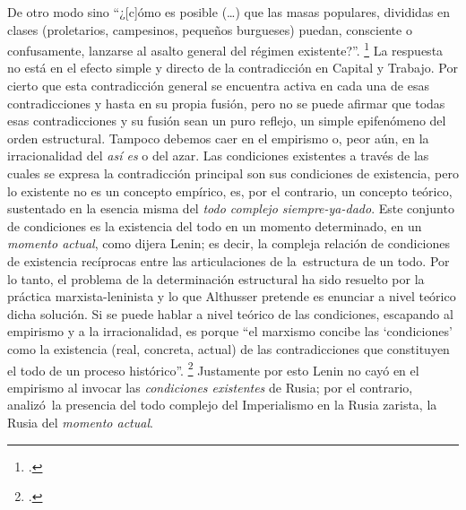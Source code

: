 De otro modo sino \enquote{¿{[}c{]}ómo es posible (\ldots) que las masas populares, divididas en clases (proletarios, campesinos, pequeños burgueses) puedan, consciente o confusamente, lanzarse al asalto general del régimen existente?}. \footcite[][80]{@7051-ALTHUSSER1965} La respuesta no está en el efecto simple y directo de la contradicción en Capital y Trabajo. Por cierto que esta contradicción general se encuentra activa en cada una de esas contradicciones y hasta en su propia fusión, pero no se puede afirmar que todas esas contradicciones y su fusión sean un puro reflejo, un simple epifenómeno del orden estructural. Tampoco debemos caer en el empirismo o, peor aún, en la irracionalidad del \emph{así es} o del azar. Las condiciones existentes a través de las cuales se expresa la contradicción principal son sus condiciones de existencia, pero lo existente no es un concepto empírico, es, por el contrario, un concepto teórico, sustentado en la esencia misma del \emph{todo complejo siempre-ya-dado}. Este conjunto de condiciones es la existencia del todo en un momento determinado, en un \emph{momento actual}, como dijera Lenin; es decir, la compleja relación de condiciones de existencia recíprocas entre las articulaciones de la~estructura de un todo. Por lo tanto, el problema de la determinación estructural ha sido resuelto por la práctica marxista-leninista y lo que Althusser pretende es enunciar a nivel teórico dicha solución. Si se puede hablar a nivel teórico de las condiciones, escapando al empirismo y a la irracionalidad, es porque \enquote{el marxismo concibe las \enquote{condiciones} como la existencia (real, concreta, actual) de las contradicciones que constituyen el todo de un proceso histórico}. \footcite[][172]{@7051-ALTHUSSER1965} Justamente por esto Lenin no cayó en el empirismo al invocar las \emph{condiciones existentes} de Rusia; por el contrario, analizó~la presencia del todo complejo del Imperialismo en la Rusia zarista, la Rusia del \emph{momento actual}.

